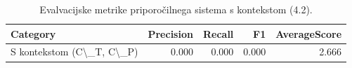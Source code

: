 \begin{table}[h]
\centering
\caption{Evalvacijske metrike priporočilnega sistema s kontekstom (4.2).}
\label{tab:evaluation_metrics_4_2}
\begin{tabular}{lrrrr}
\toprule
Category & Precision & Recall & F1 & AverageScore \\
\midrule
S kontekstom (C\textbackslash \_T, C\textbackslash \_P) & 0.000 & 0.000 & 0.000 & 2.666 \\
\bottomrule
\end{tabular}

\end{table}
